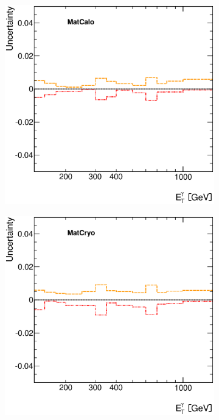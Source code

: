 \documentclass[12pt, twoside]{article}
\numberwithin{equation}{section}
\numberwithin{figure}{section}
\newenvironment{changemargin}[2]{%
\begin{list}{}{%
\setlength{\topsep}{0pt}%
\setlength{\leftmargin}{#1}%
\setlength{\rightmargin}{#2}%
\setlength{\listparindent}{\parindent}%
\setlength{\itemindent}{\parindent}%
\setlength{\parsep}{\parskip}%
}%
\item[]}{\end{list}}
\begin{document}
\begin{figure}[H]
\begin{changemargin}{-1.0cm}{-0.75cm}
\begin{changemargin}{-0.75cm}{-1.0cm}
        \hspace{-0.287\textwidth}
        \begin{subfigure}[b]{0.27\textwidth}
            \includegraphics[width=\textwidth]{./images/PhotonSystematics/PhotonSystematic-13.eps}
        \end{subfigure}
        \begin{subfigure}[b]{0.27\textwidth}
            \includegraphics[width=\textwidth]{./images/PhotonSystematics/PhotonSystematic-14.eps}

\end{subfigure}
\end{changemargin}
\end{changemargin}
\end{figure}
\end{document}
